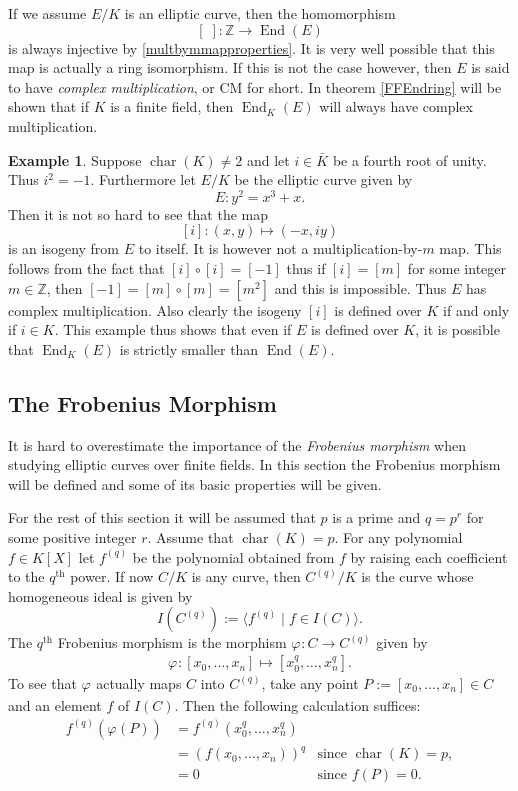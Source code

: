 \documentclass{article}
\numberwithin{equation}{section}
\theoremstyle{definition}
\newtheorem{example}[theorem]{Example}
\newcommand{\ZZ}{{\mathbb Z}} %
\newcommand{\grgen}[1]{\langle #1 \rangle} %
\newcommand{\Char}[1]{\operatorname{char} (#1)} %
\newcommand{\frob}[1][]{\varphi_{#1}} %
\newcommand{\Endring}[1]{\operatorname{End} (#1)} %
\newcommand{\Endringk}[2]{\operatorname{End}_{#2} (#1)} %
\begin{document}
If we assume $E/K$ is an elliptic curve, then the homomorphism $$[\;]:\ZZ \rightarrow \Endring{E}$$ is always injective by \ref{multbymmapproperties}. It is very well possible that this map is actually a ring isomorphism. If this is not the case however, then $E$ is said to have \emph{complex multiplication}, or CM for short. In theorem \ref{FFEndring} will be shown that if $K$ is a finite field, then $\Endringk{E}{K}$ will always have complex multiplication.

\begin{example} \label{morphism[i]}
Suppose $\Char{K} \neq 2$ and let $i\in\bar{K}$ be a fourth root of unity. Thus $i^2 = -1$. Furthermore let $E/K$ be the elliptic curve given by $$E:y^2=x^3+x.$$ Then it is not so hard to see that the map $$[i]:(x,y) \mapsto (-x,iy)$$ is an isogeny from $E$ to itself. It is however not a multiplication-by-$m$ map. This follows from the fact that $[i]\circ [i] = [-1]$ thus if $[i]=[m]$ for some integer $m\in \ZZ$, then $[-1] = [m] \circ [m] = [m^2]$ and this is impossible. Thus $E$ has complex multiplication. Also clearly the isogeny $[i]$ is defined over $K$ if and only if $i \in K$. This example thus shows that even if $E$ is defined over $K$, it is possible that $\Endringk{E}{K}$ is strictly smaller than $\Endring{E}$.
\end{example}




\subsection{The Frobenius Morphism}\label{frobenius}
It is hard to overestimate the importance of the \emph{Frobenius morphism} when studying elliptic curves over finite fields. In this section the Frobenius morphism will be defined and some of its basic properties will be given.\par  
For the rest of this section it will be assumed that $p$ is a prime and $q=p^r$ for some positive integer $r$. Assume that $\Char{K}=p$. For any polynomial $f \in K[X]$ let $f^{(q)}$ be the polynomial obtained from $f$ by raising each coefficient to the $q^{\text{th}}$ power. If now $C/K$ is any curve, then $C^{(q)}/K$ is the curve whose homogeneous ideal is given by $$I(C^{(q)}):= \grgen{f^{(q)} \; | \; f \in I(C)}.$$
The $q^{\text{th}}$ Frobenius morphism is the morphism $\frob :C \rightarrow C^{(q)}$ given by 
\begin{equation}\label{frobdefinition}\frob :[x_0,\ldots,x_n] \mapsto [x_0^q,\ldots,x_n^q].\end{equation} To see that $\frob$ actually maps $C$ into $C^{(q)}$, take any point $P:=[x_0,\ldots,x_n] \in C$ and an element $f$ of $I(C)$. Then the following calculation suffices:
\begin{align*}
f^{(q)}(\frob(P)) &=f^{(q)}(x_0^q,\ldots,x_n^q) \\
&=(f(x_0,\ldots,x_n))^q &\text{since } \Char{K}=p,\\
&=0 &\text{since }f(P)=0.
\end{align*}
\end{document}
